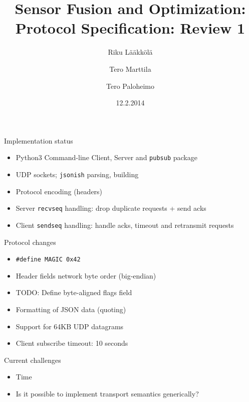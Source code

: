 \documentclass{beamer}
\title[SFO protocol]{Sensor Fusion and Optimization: Protocol Specification: Review 1}
\author{Riku Lääkkölä \and Tero Marttila \and Tero Paloheimo}
\institute{Aalto ELEC}
\date{12.2.2014}
\begin{document}
\begin{frame}
  \titlepage
\end{frame}

\begin{frame}{Implementation status}
\begin{itemize}
    \item Python3 Command-line Client, Server and \texttt{pubsub} package
    \item UDP sockets; \texttt{jsonish} parsing, building
    \item Protocol encoding (headers)
    \item Server \texttt{recvseq} handling: drop duplicate requests + send acks
    \item Client \texttt{sendseq} handling: handle acks, timeout and retransmit requests
\end{itemize}
\end{frame}

\begin{frame}{Protocol changes}
\begin{itemize}
    \item \texttt{\#define MAGIC 0x42}
    \item Header fields network byte order (big-endian)
  	\item TODO: Define byte-aligned flags field
    \item Formatting of JSON data (quoting)
    \item Support for 64KB UDP datagrams
    \item Client subscribe timeout: 10 seconds
\end{itemize}
\end{frame}

\begin{frame}{Current challenges}
\begin{itemize}
	\item Time
	\item Is it possible to implement transport semantics generically?
\end{itemize}
\end{frame}
\end{document}
